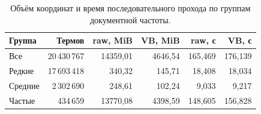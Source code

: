 \begin{table}[H]\centering\small
\begin{tabular}{lrrrrr}\toprule
Группа & Термов & raw, MiB & VB, MiB & raw, с & VB, с\\\midrule
Все & 20\,430\,767 & 14359,01 & 4646,54 & 165,469 & 176,139\\
Редкие & 17\,693\,418 & 340,32 & 145,71 & 18,408 & 18,034\\
Средние & 2\,302\,690 & 248,61 & 102,24 & 9,033 & 9,217\\
Частые & 434\,659 & 13770,08 & 4398,59 & 148,605 & 156,828\\
\bottomrule\end{tabular}
\caption{Объём координат и время последовательного прохода по группам документной частоты.}
\end{table}
